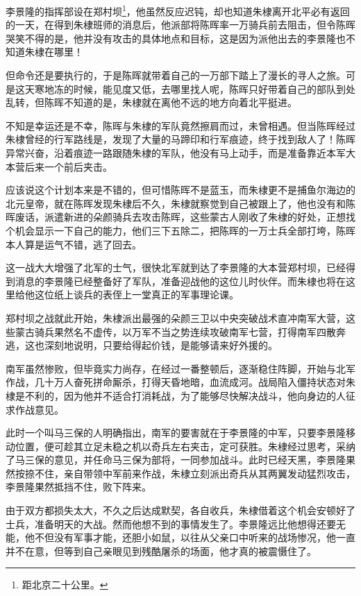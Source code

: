 \begin{multicols}{\theparacolNo}
		李景隆的指挥部设在郑村坝\footnote{距北京二十公里。}，他虽然反应迟钝，却也知道朱棣离开北平必有返回的一天，在得到朱棣班师的消息后，他派部将陈晖率一万骑兵前去阻击，但令陈晖哭笑不得的是，他并没有攻击的具体地点和目标，这是因为派他出去的李景隆也不知道朱棣在哪里！

		但命令还是要执行的，于是陈晖就带着自己的一万部下踏上了漫长的寻人之旅。可是这天寒地冻的时候，能见度又低，去哪里找人呢，陈晖只好带着自己的部队到处乱转，但陈晖不知道的是，朱棣就在离他不远的地方向着北平挺进。

		不知是幸运还是不幸，陈晖与朱棣的军队竟然擦肩而过，未曾相遇。但当陈晖经过朱棣曾经的行军路线是，发现了大量的马蹄印和行军痕迹，终于找到敌人了！陈晖异常兴奋，沿着痕迹一路跟随朱棣的军队，他没有马上动手，而是准备靠近本军大本营后来一个前后夹击。

		应该说这个计划本来是不错的，但可惜陈晖不是蓝玉，而朱棣更不是捕鱼尔海边的北元皇帝，就在陈晖发现朱棣后不久，朱棣就察觉到自己被跟上了，他也没有和陈晖废话，派遣新进的朵颜骑兵去攻击陈晖，这些蒙古人刚收了朱棣的好处，正想找个机会显示一下自己的能力，他们三下五除二，把陈晖的一万士兵全部打垮，陈晖本人算是运气不错，逃了回去。

		这一战大大增强了北军的士气，很快北军就到达了李景隆的大本营郑村坝，已经得到消息的李景隆已经整备好了军队，准备迎战他的这位儿时伙伴。而朱棣也将在这里给他这位纸上谈兵的表侄上一堂真正的军事理论课。

		郑村坝之战就此开始，朱棣派出最强的朵颜三卫以中央突破战术直冲南军大营，这些蒙古骑兵果然名不虚传，以万军不当之势连续攻破南军七营，打得南军四散奔逃，这也深刻地说明，只要给得起价钱，是能够请来好外援的。

		南军虽然惨败，但毕竟实力尚存，在经过一番整顿后，逐渐稳住阵脚，开始与北军作战，几十万人奋死拼命厮杀，打得天昏地暗，血流成河。战局陷入僵持状态对朱棣是不利的，因为他并不适合打消耗战，为了能够尽快解决战斗，他向身边的人征求作战意见。

		此时一个叫马三保的人明确指出，南军的要害就在于李景隆的中军，只要李景隆移动位置，便可趁其立足未稳之机以奇兵左右夹击，定可获胜。朱棣经过思考，采纳了马三保的意见，并任命马三保为部将，一同参加战斗。此时已经天黑，李景隆果然按捺不住，亲自带领中军前来作战，朱棣立刻派出奇兵从其两翼发动猛烈攻击，李景隆果然抵挡不住，败下阵来。

		由于双方都损失太大，不久之后达成默契，各自收兵，朱棣借着这个机会安顿好了士兵，准备明天的大战。然而他想不到的事情发生了。李景隆远比他想得还要无能，他不但没有军事才能，还胆小如鼠，以往从父亲口中听来的战场惨况，他一直并不在意，但等到自己亲眼见到残酷屠杀的场面，他才真的被震慑住了。


\end{multicols}
